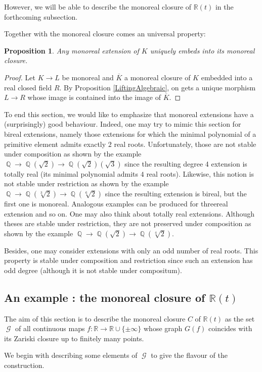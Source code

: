 \documentclass[12pt]{amsart}
\newtheorem{prop}[thm]{Proposition}
\theoremstyle{definition}
\DeclareMathOperator{\QQ}{\mathbb Q}
\def \RR {{\mathbb R}}
\DeclareMathOperator{\GM}{\mathcal{G}}
\begin{document}
However, we will be able to describe the monoreal closure of $\RR(t)$ in the forthcoming subsection.


Together with the monoreal closure comes an universal property:
\begin{prop}
	Any monoreal extension of $K$ uniquely embeds into its monoreal closure.
\end{prop}
\begin{proof}
	Let $K\to L$ be monoreal and $\overline{K}$ a monoreal closure of $K$ embedded into a real closed field $R$. 
	By Proposition \ref{LiftingAlgebraic}, on gets a unique morphism $L\to R$ whose image is contained into the image of $\overline{K}$. 
\end{proof}


To end this section, we would like to emphasize that monoreal extensions have a (surprisingly) good behaviour. Indeed, one may try to mimic this section for bireal extensions, namely those extensions for which the minimal polynomial of a primitive element admits exactly $2$ real roots. Unfortunately, those are not stable under composition as shown by the example 
$\QQ\to \QQ(\sqrt{2})\to \QQ(\sqrt{2})(\sqrt{3})$ since the resulting degree 4 extension is totally real (its minimal polynomial admits $4$ real roots). 
Likewise, this notion is not stable under restriction
as shown by the example $\QQ\to \QQ(\sqrt[3]{2})\to \QQ(\sqrt[6]{2})$ since the resulting extension is bireal, but the first one is monoreal.
Analogous examples can be produced for threereal extension and so on.
One may also think about totally real extensions. Although theses are stable under restriction, they are not preserved under composition
as shown by the example 
$\QQ\to \QQ(\sqrt{2})\to \QQ(\sqrt[4]{2})$. 

Besides, one may consider extensions with only an odd number of real roots. This property is stable under composition and restriction since such an extension has odd degree (although it is not stable under compositum).


\subsection{An example : the monoreal closure of $\RR(t)$}
The aim of this section is to describe 
the monoreal closure $C$ of $\RR(t)$ as the set $\GM$ of all continuous maps $f:\RR\to \RR\cup\{\pm\infty\}$ whose graph $G(f)$ coincides with its Zariski closure up to finitely many points.

We begin with describing some elements of $\GM$ to give the flavour of the construction.
\end{document}
